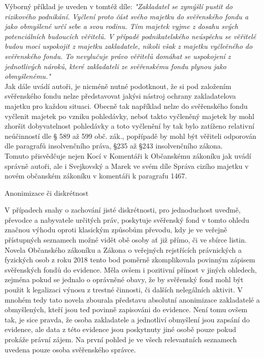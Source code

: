 \documentclass{article}
\begin{document}
 Výborný příklad je uveden v tomtéž díle: \textit{"Zakladatel se zymýšlí pustit do rizikového podnikání. Vyčlení proto část svého majetku do svěřenského fondu a jako obmyšlené určí sebe a svou rodinu. Tím majetek vyjme z dosahu svých potenciálních budoucích věřitelů. V případě podnikatelského neúspěchu se věřitelé budou moci uspokojit z majetku zakladatele, nikoli však z majetku vyčleěného do svěřenského fondu. To nevylučuje právo věřitelů domáhat se uspokojení z jednotlivých nároků, které zakladateli ze svěřenskému fondu plynou jako obmyšlenému."}\\
 
 Jak dále uvádí autoři, je nicméně nutné podotknout, že si pod založením svěřenského fondu nelze představovat jakýsi nástroj ochrany zakladatelova majetku pro každou situaci. Obecně tak například nelze do svěřenského fondu vyčlenit majetek po vzniku pohledávky, neboť takto vyčleněný majetek by mohl zhoršit dobyvatelnost pohledávky a toto vyčlenění by tak bylo zatíženo relativní neúčinností dle § 589 až 599 obč. zák., popřípadě by mohl být věřiteli odporován dle paragrafů insolvenčního práva, §235 až §243 insolvenčního zákona.\\
 
 Tomuto přisvědčuje nejen Kocí v Komentáři k Občanskému zákoníku jak uvádí správně autoři, ale i Svejkovský a Marek ve svém díle Správa cizího majetku v novém občanském zákoníku v komentáři k paragrafu 1467.\\
 
 \newpage
 \thispagestyle{smallertextinheader}
 
  \begin{enumerate}
 {\Large\item[3.] Anonimizace či diskrétnost}
 \end{enumerate}
 
 V případech snahy o zachování jisté diskrétnosti, pro jednoduchost uveďmě, převodce a nabyvatele určitých práv, poskytuje svěřenský fond v tomto ohledu značnou výhodu oproti klasickým způsobům převodu, kdy je ve veřejně přístupných seznamech možné vidět obě osoby ať již přímo, či ve sbírce listin. Novela Občanského zákoníku a Zákona o veřejných rejstřících právnických a fyzických osob z roku 2018 tento bod poměrně zkomplikovala povinným zápisem svěřenských fondů do evidence. Měla ovšem i pozitivní přínost v jiných ohledech, zejména pokud se jednalo o oprávněné obavy, že by svěřenský fond mohl být použit k legalizaci výnosu z trestné činnosti, či dalších nelegálních aktivit. V mnohém tedy tato novela zbourala představu absolutní anonimizace zakladatelé a obmyšlených, kteří jsou teď povinně zapisováni do evidence. Není tomu ovšem tak, je sice pravda, že osoba zakladatele a jednotliví obmyšlení jsou zapsání do evidence, ale data z této evidence jsou poskytnuty jiné osobě pouze pokud prokáže právní zájem. Na první pohled je ve všech relevantních seznamech uvedena pouze osoba svěřenského správce.\\
 
\end{document}
